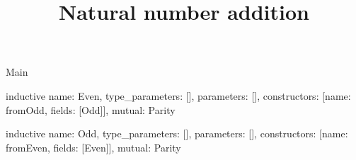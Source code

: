 \begin{lexlean}{Main}
\title{Natural number addition}
\begin{semanticmodule}
inductive{
  name: Even,
  type_parameters: [],
  parameters: [],
  constructors: [{name: fromOdd, fields: [Odd]}],
  mutual: Parity
}

inductive{
  name: Odd,
  type_parameters: [],
  parameters: [],
  constructors: [{name: fromEven, fields: [Even]}],
  mutual: Parity
}
\end{semanticmodule}
\end{lexlean}
